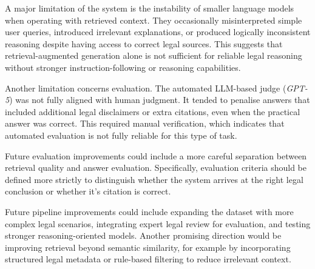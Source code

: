 \documentclass[fleqn,moreauthors,10pt]{ds_report}
\begin{document}
A major limitation of the system is the instability of smaller language models when operating with retrieved context. They occasionally misinterpreted simple user queries, introduced irrelevant explanations, or produced logically inconsistent reasoning despite having access to correct legal sources. This suggests that retrieval-augmented generation alone is not sufficient for reliable legal reasoning without stronger instruction-following or reasoning capabilities.

Another limitation concerns evaluation. The automated LLM-based judge (\emph{GPT-5}) was not fully aligned with human judgment. It tended to penalise answers that included additional legal disclaimers or extra citations, even when the practical answer was correct. This required manual verification, which indicates that automated evaluation is not fully reliable for this type of task.


Future evaluation improvements could include a more careful separation between retrieval quality and answer evaluation. Specifically, evaluation criteria should be defined more strictly to distinguish whether the system arrives at the right legal conclusion or whether it's citation is correct. 

Future pipeline improvements could include expanding the dataset with more complex legal scenarios, integrating expert legal review for evaluation, and testing stronger reasoning-oriented models. Another promising direction would be improving retrieval beyond semantic similarity, for example by incorporating structured legal metadata or rule-based filtering to reduce irrelevant context.




\end{document}
